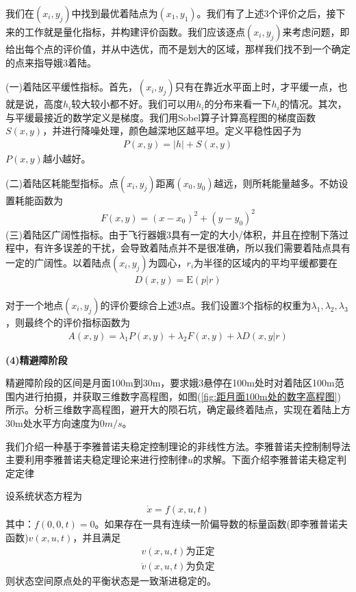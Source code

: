             我们在$(x_i,y_j)$中找到最优着陆点为$(x_1,y_1)$。我们有了上述3个评价之后，接下来的工作就是量化指标，并构建评价函数。我们应该逐点$(x_i,y_j)$来考虑问题，即给出每个点的评价值，并从中选优，而不是划大的区域，那样我们找不到一个确定的点来指导娥3着陆。
            \par
            (一)着陆区平缓性指标。首先，$(x_i,y_j)$只有在靠近水平面上时，才平缓一点，也就是说，高度$h_i$较大较小都不好。我们可以用$h_i$的分布来看一下$h_i$的情况。其次，与平缓最接近的数学定义是梯度。我们用Sobel算子计算高程图的梯度函数$S(x,y)$，并进行降噪处理，颜色越深地区越平坦。定义平稳性因子为
            \begin{align*}
            P(x,y) = |h|+S(x,y)
            \end{align*}
            $P(x,y)$越小越好。
            \par
            (二)着陆区耗能型指标。点$(x_i,y_j)$距离$(x_0,y_0)$越远，则所耗能量越多。不妨设置耗能函数为
            \begin{align*}
            F(x,y) = (x-x_0)^2+(y - y_0)^2
            \end{align*}
            (三)着陆区广阔性指标。由于飞行器娥3具有一定的大小/体积，并且在控制下落过程中，有许多误差的干扰，会导致着陆点并不是很准确，所以我们需要着陆点具有一定的广阔性。以着陆点$(x_i,y_j)$为圆心，$r_i$为半径的区域内的平均平缓都要在
            \begin{align*}
            D(x,y) = \mathrm{E}(p|r)
            \end{align*}
            \par
            对于一个地点$(x_i,y_j)$的评价要综合上述3点。我们设置3个指标的权重为$\lambda_1,\lambda_2,\lambda_3$，则最终个的评价指标函数为
            \begin{align*}
            A(x,y) = \lambda_1 P(x,y)+\lambda_2F(x,y)+\lambda D(x,y|r)
            \end{align*}
            \par
            \textbf{(4)精避障阶段}
            \par
            精避障阶段的区间是月面100m到30m，要求娥3悬停在100m处时对着陆区100m范围内进行拍摄，并获取三维数字高程图，如图(\ref{fig:距月面100m处的数字高程图})所示。分析三维数字高程图，避开大的陨石坑，确定最终着陆点，实现在着陆上方30m处水平方向速度为0$m/s$。
            \par
            我们介绍一种基于李雅普诺夫稳定控制理论的非线性方法。李雅普诺夫控制制导法主要利用李雅普诺夫稳定理论来进行控制律$u$的求解。下面介绍李雅普诺夫稳定判定定律
            \begin{theorem}[李雅普诺夫稳定判定定律]
            \par
            设系统状态方程为
            \begin{align*}
            \dot{x} = f(x,u,t)
            \end{align*}
            其中：$f(0,0,t) = 0$。如果存在一具有连续一阶偏导数的标量函数(即李雅普诺夫函数)$v(x,u,t)$，并且满足
            \begin{align*}
            v(x,u,t)\text{为正定}\\
            \dot{v}(x,u,t)\text{为负定}
            \end{align*}
            则状态空间原点处的平衡状态是一致渐进稳定的。
            \end{theorem}
